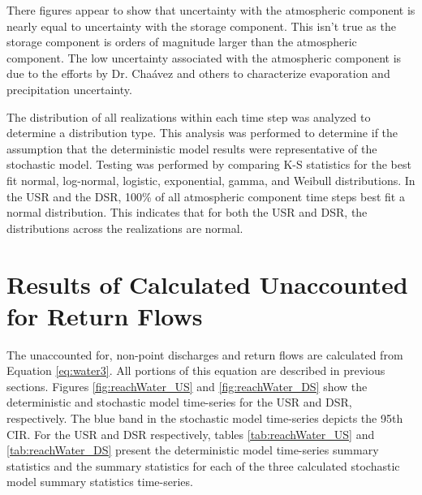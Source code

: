 There figures appear to show that uncertainty with the atmospheric component is nearly equal to uncertainty with the storage component.  This isn't true as the storage component is orders of magnitude larger than the atmospheric component.  The low uncertainty associated with the atmospheric component is due to the efforts by Dr. Cha\'{a}vez and others to characterize evaporation and precipitation uncertainty.

The distribution of all realizations within each time step was analyzed to determine a distribution type.  This analysis was performed to determine if the assumption that the deterministic model results were representative of the stochastic model.  Testing was performed by comparing K-S statistics for the best fit normal, log-normal, logistic, exponential, gamma, and Weibull distributions.  In the USR and the DSR, 100\% of all atmospheric component time steps best fit a normal distribution. This indicates that for both the USR and DSR, the distributions across the realizations are normal. 
\clearpage{}

\section{Results of Calculated Unaccounted for Return Flows}
\label{sec:WaterModelResults}

The unaccounted for, non-point discharges and return flows are calculated from Equation \ref{eq:water3}.  All portions of this equation are described in previous sections.  Figures \ref{fig:reachWater_US} and \ref{fig:reachWater_DS} show the deterministic and stochastic model time-series for the USR and DSR, respectively.  The blue band in the stochastic model time-series depicts the 95th CIR.  For the USR and DSR respectively, tables \ref{tab:reachWater_US} and \ref{tab:reachWater_DS} present the deterministic model time-series summary statistics and the summary statistics for each of the three calculated stochastic model summary statistics time-series.

